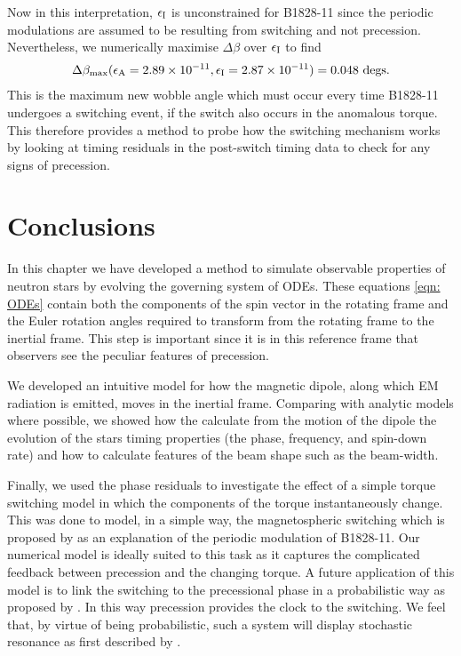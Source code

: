 \documentclass[../full_thesis/full_thesis.tex]{subfiles}
\begin{document}
Now in this interpretation, $\epsilon_{\mathrm{I}}$ is unconstrained for B1828-11 since the
periodic modulations are assumed to be resulting from switching and not
precession. Nevertheless, we numerically maximise $\Delta\beta$ over $\epsilon_{\mathrm{I}}$ to
find
\begin{align}
\Delta\beta_{\textrm{max}}(\epsilon_{\mathrm{A}}=2.89\times10^{-11}, \epsilon_{\mathrm{I}}=2.87\times10^{-11})
= 0.048 \textrm{ degs}.
\end{align}
This is the maximum new wobble angle which must occur every time B1828-11 undergoes a
switching event, if the switch also occurs in the anomalous torque. This
therefore provides a method to probe how the switching mechanism works by
looking at timing residuals in the post-switch timing data to check for
any signs of precession.

\section{Conclusions}

In this chapter we have developed a method to simulate observable properties of
neutron stars by evolving the governing system of ODEs. These equations
\eqref{eqn: ODEs} contain both the components of the spin vector in the
rotating frame and the Euler rotation angles required to transform from
the rotating frame to the inertial frame. This step is important since it is in
this reference frame that observers see the peculiar features of precession.

We developed an intuitive model for how the magnetic dipole, along which EM
radiation is emitted, moves in the inertial frame. Comparing with analytic
models where possible, we showed how the calculate from the motion of the
dipole the evolution of the stars timing properties (the phase, frequency, and
spin-down rate) and how to calculate features of the beam shape such as the
beam-width.

Finally, we used the phase residuals to investigate the effect of a simple torque
switching model in which the components of the torque instantaneously change.
This was done to model, in a simple way, the magnetospheric switching which is
proposed by \citet{Lyne2010} as an explanation of the periodic modulation of
B1828-11. Our numerical model is ideally suited to this task as it captures the
complicated feedback between precession and the changing torque.
A future application of this model is to link the switching to the precessional
phase in a probabilistic way as proposed by \citet{Jones2012}. In this way
precession provides the clock to the switching. We feel that, by virtue of
being probabilistic, such a system will display stochastic resonance as first
described by \citet{Cordes2013}.

\biblio
\end{document}
